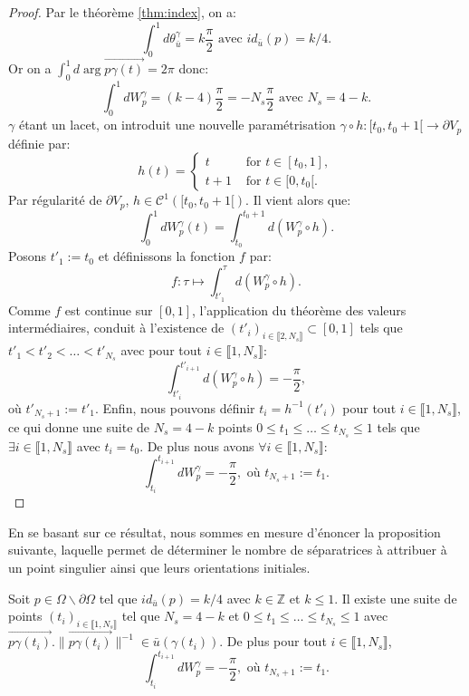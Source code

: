 \begin{proof}
Par le théorème \ref{thm:index}, on a:
$$\int_0^1 d\theta^\gamma_{\bar{u}}=k\frac{\pi}{2}\mbox{ avec }id_{\bar{u}}(p)=k/4.$$
Or on a $\displaystyle\int_0^1 d\arg{\overrightarrow{p\gamma(t)}}=2\pi$ donc:
$$\int_0^1 dW_p^\gamma=(k-4)\frac{\pi}{2}=-N_s\frac{\pi}{2} \mbox{ avec } N_s=4-k.$$
$\gamma$ étant un lacet, on introduit une nouvelle paramétrisation $\gamma\circ h:[t_0, t_0+1[\longrightarrow\partial V_p$ définie par:
$$
h(t) =
    \begin{cases}
        t&\mbox{ for }t\in[t_0, 1], \\
        t+1&\mbox{ for }t\in[0,t_0[.
    \end{cases}
$$
Par régularité de $\partial V_p$, $h\in\mathcal{C}^1([t_0, t_0+1[)$. Il vient alors que:
$$\int_0^1 dW_p^\gamma(t)=\int_{t_0}^{t_0+1} d(W_p^\gamma \circ h).$$
Posons $t'_1 := t_0$ et définissons la fonction $f$ par:
$$f: \tau \mapsto \int_{t'_1}^\tau d(W_p^\gamma \circ h).$$
Comme $f$ est continue sur $[0,1]$, l'application du théorème des valeurs intermédiaires, conduit à l'existence de $(t'_i)_{i\in\llbracket 2,N_s\rrbracket}\subset[0, 1]$ tels que $t'_1<t'_2<\dots<t'_{N_s}$ avec pour tout $i\in\llbracket1, N_s\rrbracket$:
$$\int_{t'_i}^{t'_{i+1}}d(W_p^\gamma\circ h)=-\frac{\pi}{2},$$
où $t'_{N_s+1}:=t'_1$. Enfin, nous pouvons définir $t_i=h^{-1}(t'_i)$ pour tout $i\in\llbracket 1,N_s\rrbracket$, ce qui donne une suite de $N_s=4-k$ points $0\leq t_1\leq\dots\leq t_{N_s}\leq 1$ tels que $\exists i\in\llbracket 1,N_s\rrbracket$ avec $t_i=t_0$. De plus nous avons $\forall i\in\llbracket 1,N_s\rrbracket$:
$$\int_{t_i}^{t_{i+1}}dW_p^\gamma=-\frac{\pi}{2},\mbox{ où }t_{N_s+1}:=t_1.$$
\end{proof}

En se basant sur ce résultat, nous sommes en mesure d'énoncer la proposition suivante, laquelle permet de déterminer le nombre de séparatrices à attribuer à un point singulier ainsi que leurs orientations initiales.

\begin{proposition}
    \label{prop:align_sepa_voisinnage}
    Soit $p\in\Omega\backslash\partial\Omega$ tel que $id_{\bar{u}}(p)=k/4$ avec $k\in\mathbb{Z}$ et $k\leq 1$. Il existe une suite de points $(t_i)_{i\in\llbracket1, N_s\rrbracket}$ tel que $N_s=4-k$ et $0\leq t_1\leq\dots\leq t_{N_s}\leq 1$ avec $\overrightarrow{p\gamma(t_i)}.\|\overrightarrow{p\gamma(t_i)}\|^{-1}\in\bar{u}(\gamma(t_i))$. De plus pour tout $i\in\llbracket 1, N_s\rrbracket$,
    $$\int_{t_i}^{t_{i+1}}dW_p^\gamma=-\frac{\pi}{2},\mbox{ où }t_{N_s+1}:=t_1.$$
\end{proposition}

